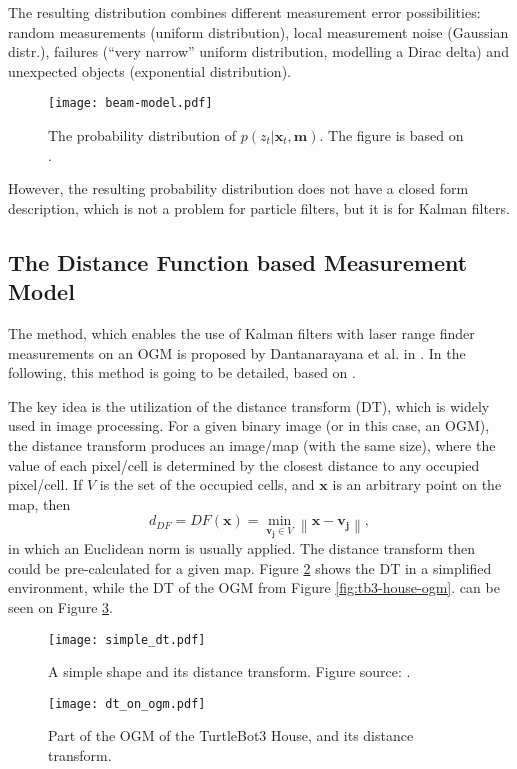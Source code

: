 The resulting distribution combines different measurement error possibilities:
random measurements (uniform distribution), local measurement noise (Gaussian distr.),
failures (``very narrow'' uniform distribution, modelling a Dirac delta) and unexpected
objects (exponential distribution).
\begin{figure}[htbp]
    \centering
    \texttt{[image: beam-model.pdf]}
    \caption{The probability distribution of $p(z_t | \mathbf{x}_t,\mathbf{m})$.
        The figure is based on \cite{Thrun2005}.}
    \label{fig:beam-model}
\end{figure}

However, the resulting probability distribution does not have a closed form description, which is
not a problem for particle filters, but it is for Kalman filters.

\subsection{The Distance Function based Measurement Model}\label{subsec:dt-meas-model}
The method, which enables the use of Kalman filters with laser range finder measurements on an OGM is proposed
by Dantanarayana et al. in \cite{Dantanarayana2013,Dantanarayana2016}.
In the following, this method is going to be detailed, based on \cite{Dantanarayana2016b}.

The key idea is the utilization of the distance transform (DT), which is widely used in
image processing.
For a given binary image (or in this case, an OGM), the distance transform
produces an image/map (with the same size), where the value of each pixel/cell is
determined by the closest distance to any occupied pixel/cell.
If $V$ is the set of the occupied cells, and $\mathbf{x}$ is an arbitrary point on the map, then
\begin{equation}
    d_{D F}=D F(\mathbf{x})=\min _{\mathbf{v}_{\mathbf{j}} \in V}\left\|\mathbf{x}-\mathbf{v}_{\mathbf{j}}\right\|,
\end{equation}
in which an Euclidean norm is usually applied.
The distance transform then could be pre-calculated for a given map.
Figure \ref{fig:simple-dt} shows the DT in a simplified environment,
while the DT of the OGM from Figure \ref{fig:tb3-house-ogm}. can be seen on Figure \ref{fig:gazebo-map-ogm-dt}.
\begin{figure}[htbp]
    \centering
    \texttt{[image: simple\_dt.pdf]}
    \caption{A simple shape and its distance transform. Figure source: \cite{Dantanarayana2016b}.}
    \label{fig:simple-dt}
\end{figure}
\begin{figure}[htbp]
    \centering
    \texttt{[image: dt\_on\_ogm.pdf]}
    \caption{Part of the OGM of the TurtleBot3 House, and its distance transform.}
    \label{fig:gazebo-map-ogm-dt}
\end{figure}

